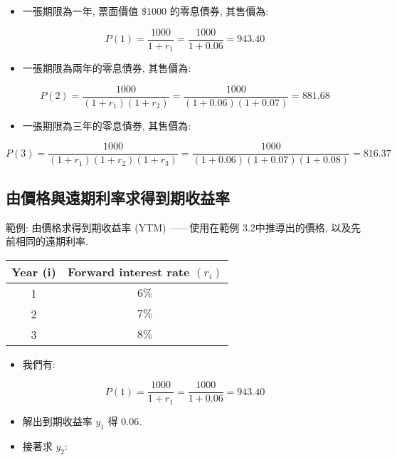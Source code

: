 \documentclass[letterpaper]{article}
\begin{document}
		
		\begin{itemize}
			\item 一張期限為一年, 票面價值 \$1000 的零息債券, 其售價為: 
		\end{itemize}
		
		$$
		P (1) =\frac{1000}{1+r_{1}}=\frac{1000}{1+0.06}=943.40
		$$
		
		\begin{itemize}
			\item 一張期限為兩年的零息債券, 其售價為: 
		\end{itemize}
		
		$$
		P (2) =\frac{1000}{\left (1+r_{1}\right) \left (1+r_{2}\right) }=\frac{1000}{ (1+0.06)  (1+0.07) }=881.68
		$$
		
		\begin{itemize}
			\item 一張期限為三年的零息債券, 其售價為: 
		\end{itemize}
		
		$$
		P (3) =\frac{1000}{\left (1+r_{1}\right) \left (1+r_{2}\right) \left (1+r_{3}\right) }=\frac{1000}{ (1+0.06)  (1+0.07)  (1+0.08) }=816.37
		$$
		
		\subsection{由價格與遠期利率求得到期收益率}
		
		範例: 由價格求得到期收益率 (YTM) ——使用在範例 3.2中推導出的價格, 以及先前相同的遠期利率.  
		
		
		\begin{center}
			\begin{tabular}{cc}
				Year  (i) & Forward interest rate $\left (r_{i}\right) $ \\
				\hline
				1 & $6 \%$ \\
				2 & $7 \%$ \\
				3 & $8 \%$ \\
			\end{tabular}
		\end{center}
		
		\begin{itemize}
			\item 我們有: 
		\end{itemize}
		
		$$
		P (1) =\frac{1000}{1+r_{1}}=\frac{1000}{1+0.06}=943.40
		$$
		
		\begin{itemize}
			\item 解出到期收益率 \( y_{1} \) 得 \( 0.06 \).  
			\item 接著求 \( y_{2} \):  
		\end{itemize}
		
\end{document}
